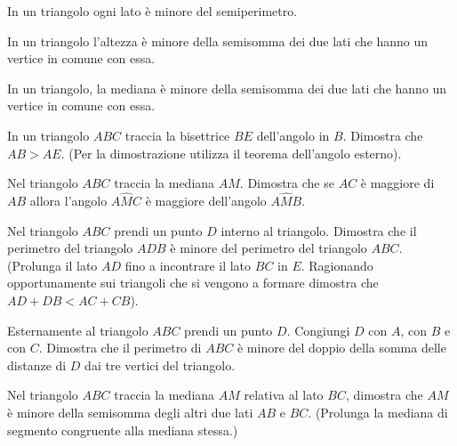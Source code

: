 \begin{multicols}{2}
\begin{esercizio}
\label{ese:3.89}
In un triangolo ogni lato è minore del semiperimetro.
\end{esercizio}

\begin{esercizio}
\label{ese:3.90}
In un triangolo l'altezza è minore della semisomma dei due lati che hanno un vertice in comune con essa.
\end{esercizio}

\begin{esercizio}
\label{ese:3.91}
In un triangolo, la mediana è minore della semisomma dei due lati che hanno un vertice in comune con essa.
\end{esercizio}

\begin{esercizio}
\label{ese:3.92}
In un triangolo $ABC$ traccia la bisettrice $BE$ dell'angolo in $B$. Dimostra che $AB>AE$. (Per la dimostrazione utilizza il teorema dell'angolo esterno).
\end{esercizio}

\begin{esercizio}
\label{ese:3.93}
Nel triangolo $ABC$ traccia la mediana $AM$. Dimostra che se $AC$ è maggiore di $AB$ allora l'angolo $A\widehat{M}C$ è maggiore dell'angolo $A\widehat{M}B$.
\end{esercizio}

\begin{esercizio}
\label{ese:3.94}
Nel triangolo $ABC$ prendi un punto $D$ interno al triangolo. Dimostra che il perimetro del triangolo $ADB$ è minore del perimetro del triangolo $ABC$. (Prolunga il lato $AD$ fino a incontrare il lato $BC$ in $E$. Ragionando opportunamente sui triangoli che si vengono a formare dimostra che $AD+DB<AC+CB$).
\end{esercizio}

\begin{esercizio}
\label{ese:3.95}
Esternamente al triangolo $ABC$ prendi un punto $D$. Congiungi $D$ con $A$, con $B$ e con $C$. Dimostra che il perimetro di $ABC$ è minore del doppio della somma delle distanze di $D$ dai tre vertici del triangolo.
\end{esercizio}

\begin{esercizio}
\label{ese:3.96}
Nel triangolo $ABC$ traccia la mediana $AM$ relativa al lato $BC$, dimostra che $AM$ è minore della semisomma degli altri due lati $AB$ e $BC$. (Prolunga la mediana di segmento congruente alla mediana stessa.)
\end{esercizio}


\end{multicols}
